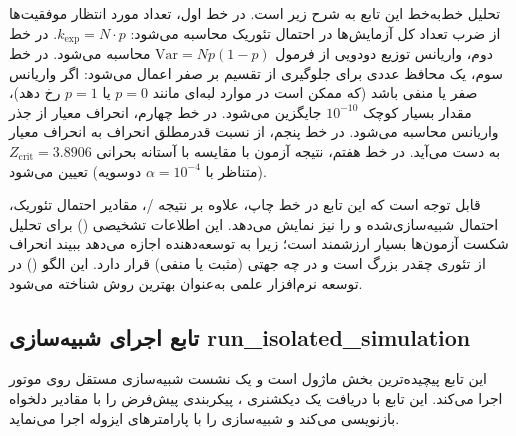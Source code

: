 تحلیل خط‌به‌خط این تابع به شرح زیر است. در خط اول، تعداد مورد انتظار موفقیت‌ها از ضرب تعداد کل آزمایش‌ها در احتمال تئوریک محاسبه می‌شود: $k_{\text{exp}} = N \cdot p$. در خط دوم، واریانس توزیع دودویی از فرمول $\text{Var} = N p (1-p)$ محاسبه می‌شود. در خط سوم، یک محافظ عددی برای جلوگیری از تقسیم بر صفر اعمال می‌شود: اگر واریانس صفر یا منفی باشد (که ممکن است در موارد لبه‌ای مانند $p = 0$ یا $p = 1$ رخ دهد)، مقدار بسیار کوچک $10^{-10}$ جایگزین می‌شود. در خط چهارم، انحراف معیار از جذر واریانس محاسبه می‌شود. در خط پنجم،  از نسبت قدرمطلق انحراف به انحراف معیار به دست می‌آید. در خط هفتم، نتیجه آزمون با مقایسه  با آستانه بحرانی $Z_{\text{crit}} = 3.8906$ (متناظر با $\alpha = 10^{-4}$ دوسویه) تعیین می‌شود.

قابل توجه است که این تابع در خط چاپ، علاوه بر نتیجه /، مقادیر احتمال تئوریک، احتمال شبیه‌سازی‌شده و  را نیز نمایش می‌دهد. این اطلاعات تشخیصی () برای تحلیل شکست آزمون‌ها بسیار ارزشمند است؛ زیرا به توسعه‌دهنده اجازه می‌دهد ببیند انحراف از تئوری چقدر بزرگ است و در چه جهتی (مثبت یا منفی) قرار دارد. این الگو () در توسعه نرم‌افزار علمی به‌عنوان بهترین روش شناخته می‌شود.

\subsection{تابع اجرای شبیه‌سازی run\_isolated\_simulation}

این تابع پیچیده‌ترین بخش ماژول است و یک نشست شبیه‌سازی مستقل روی موتور  اجرا می‌کند. این تابع با دریافت یک دیکشنری ، پیکربندی پیش‌فرض را با مقادیر دلخواه بازنویسی می‌کند و شبیه‌سازی را با پارامترهای ایزوله اجرا می‌نماید.

